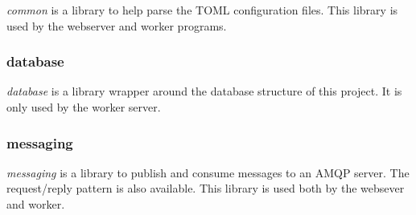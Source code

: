 \documentclass[../documentation.tex]{subfiles}
\begin{document}
\textit{common} is a library to help parse the TOML configuration files.
This library is used by the webserver and worker programs.

\subsubsection{database}

\textit{database} is a library wrapper around the database structure
of this project. It is only used by the worker server.

\subsubsection{messaging}

\textit{messaging} is a library to
publish and consume messages to an AMQP server.
The request/reply pattern is also available.
This library is used both by the websever
and worker.
\end{document}
